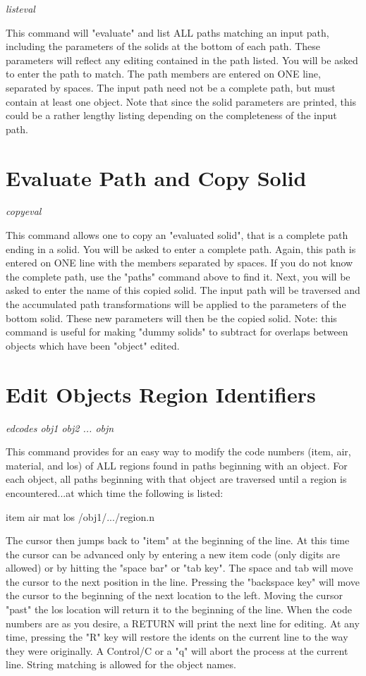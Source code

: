{\em \center
listeval
}

This command will "evaluate" and list ALL paths matching an input path, including the
parameters of the solids at the bottom of each path.
These parameters will reflect any editing contained in the path listed.
You will be asked to enter the path to match.
The path members are entered on ONE line, separated by spaces.
The input path need not be a complete path, but must contain at least
one object.
Note that since the solid parameters are printed, this could be a
rather lengthy listing depending on the completeness of the input path.

\section{Evaluate Path and Copy Solid}

{\em \center
copyeval
}

This command allows one to copy an "evaluated solid", that is a complete path
ending in a solid.
You will be asked to enter a complete path.
Again, this path is entered on ONE line with the members separated by spaces.
If you do not know the complete path, use the "paths" command above to find it.
Next, you will be asked to enter the name of this copied solid.
The input path will be traversed and the accumulated path transformations will
be applied to the parameters of the bottom solid.
These new parameters will then be the copied solid.
Note:  this command is useful for making "dummy solids" to subtract for
overlaps between objects which have been "object" edited.

\section{Edit Objects Region Identifiers}

{\em \center
edcodes obj1 obj2 ... objn
}

This command provides for an easy way to modify the code numbers (item, air, material, and los)
of ALL regions found in paths beginning with an object.
For each object, all paths beginning with that object are traversed until a region
is encountered...at which time the following is listed:

item  air  mat  los      /obj1/.../region.n

The cursor then jumps back to "item" at the beginning of the line.
At this time the cursor can be advanced only by entering a new item code
(only digits are allowed) or by hitting the "space bar" or "tab key".
The space and tab will move the cursor to the next position in the line.
Pressing the "backspace key" will move the cursor to the beginning of
the next location to the left.
Moving the cursor "past" the los location
will return it to the beginning of the line.
When the code numbers are as you desire,
a RETURN will print the next line
for editing.
At any time, pressing the "R" key will restore the idents on the current
line to the way they were originally.
A Control/C or a "q" will abort the process at the current line.
String matching is allowed for the object names.

